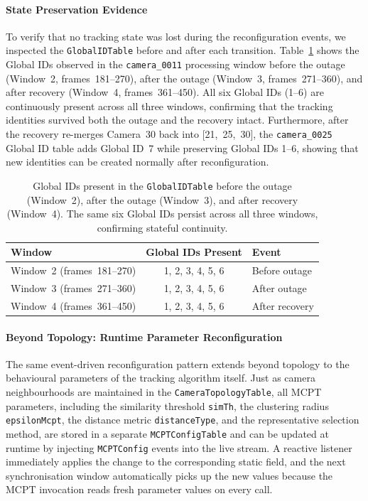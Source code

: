 \documentclass[review]{elsarticle}
\begin{document}
\paragraph{State Preservation Evidence}
To verify that no tracking state was lost during the reconfiguration events, we inspected the \texttt{GlobalIDTable} before and after each transition. Table~\ref{tab:global_id_evidence} shows the Global IDs observed in the \texttt{camera\_0011} processing window before the outage (Window~2, frames~181--270), after the outage (Window~3, frames~271--360), and after recovery (Window~4, frames~361--450). All six Global IDs (1--6) are continuously present across all three windows, confirming that the tracking identities survived both the outage and the recovery intact. Furthermore, after the recovery re-merges Camera~30 back into \mbox{[21, 25, 30]}, the \texttt{camera\_0025} Global ID table adds Global ID~7 while preserving Global IDs 1--6, showing that new identities can be created normally after reconfiguration.

\begin{table}[H]
    \centering
    \caption{Global IDs present in the \texttt{GlobalIDTable} before the outage (Window~2), after the outage (Window~3), and after recovery (Window~4). The same six Global IDs persist across all three windows, confirming stateful continuity.}
    \label{tab:global_id_evidence}
    \begin{tabular}{@{}lcl@{}}
        \toprule
        \textbf{Window} & \textbf{Global IDs Present} & \textbf{Event} \\ \midrule
        Window~2 (frames~181--270) & 1, 2, 3, 4, 5, 6 & Before outage \\
        Window~3 (frames~271--360) & 1, 2, 3, 4, 5, 6 & After outage \\
        Window~4 (frames~361--450) & 1, 2, 3, 4, 5, 6 & After recovery \\ \bottomrule
    \end{tabular}
\end{table}


\paragraph{Beyond Topology: Runtime Parameter Reconfiguration}
The same event-driven reconfiguration pattern extends beyond topology to the behavioural parameters of the tracking algorithm itself. Just as camera neighbourhoods are maintained in the \texttt{CameraTopologyTable}, all MCPT parameters, including the similarity threshold \texttt{simTh}, the clustering radius \texttt{epsilonMcpt}, the distance metric \texttt{distanceType}, and the representative selection method, are stored in a separate \texttt{MCPTConfigTable} and can be updated at runtime by injecting \texttt{MCPTConfig} events into the live stream. A reactive listener immediately applies the change to the corresponding static field, and the next synchronisation window automatically picks up the new values because the MCPT invocation reads fresh parameter values on every call.
\end{document}
